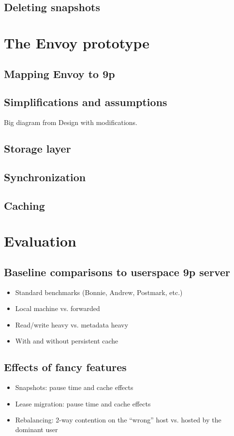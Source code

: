 \documentclass[a4paper,12pt]{article}
\begin{document}
\subsection{Deleting snapshots}

\section{The Envoy prototype}

\subsection{Mapping Envoy to 9p}
\subsection{Simplifications and assumptions}
Big diagram from Design with modifications.
\subsection{Storage layer}
\subsection{Synchronization}
\subsection{Caching}

\section{Evaluation}

\subsection{Baseline comparisons to userspace 9p server}
\begin{itemize}
\item Standard benchmarks (Bonnie, Andrew, Postmark, etc.)
\item Local machine vs. forwarded
\item Read/write heavy vs. metadata heavy
\item With and without persistent cache
\end{itemize}
\subsection{Effects of fancy features}
\begin{itemize}
\item Snapshots: pause time and cache effects
\item Lease migration: pause time and cache effects
\item Rebalancing: 2-way contention on the ``wrong'' host vs. hosted by the dominant user
\end{itemize}
\end{document}
